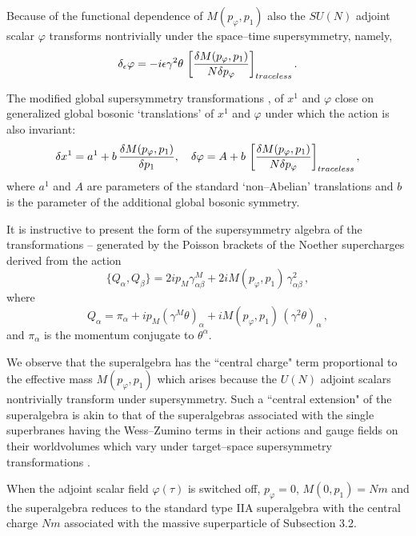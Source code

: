 \documentclass[a4paper,12pt]{article}
\begin{document}
Because of the functional dependence of $M(p_\varphi,p_1)$ also
the $SU(N)$ adjoint scalar $\varphi$ transforms nontrivially under
the space--time supersymmetry, namely,
\begin{equation}\label{varphi}
\delta_\epsilon\varphi=-i\epsilon\gamma^2\theta\,
\left[{{\delta M(p_\varphi,p_1)}\over{N\delta p_\varphi}}\right]_{traceless}.
\end{equation}

The modified global supersymmetry transformations ,
 of $x^1$ and $\varphi$ close on generalized global bosonic
`translations' of $x^1$ and $\varphi$ under which the action
 is also invariant:
\begin{equation}\label{b}
\delta x^1=a^1+b\,{{\delta
M(p_\varphi,p_1)}\over{\delta p_1}}, \quad
\delta\varphi=A+b\,\left[{{\delta M(p_\varphi,p_1)}
\over{N\delta p_\varphi}}\right]_{traceless},
\end{equation}
where $a^1$ and $A$ are parameters of the standard `non--Abelian'
translations and $b$ is the parameter of the additional global
bosonic symmetry.

It is instructive to present the form of the supersymmetry algebra
of the transformations -- generated by the  Poisson
brackets of the Noether supercharges derived from the action
\begin{equation}\label{susya}
\{Q_\alpha,Q_\beta\}=2ip_M\gamma^M_{\alpha\beta}
+2iM(p_\varphi,p_1)\,\gamma^2_{\alpha\beta}\,,
\end{equation}
where
\begin{equation}\label{Q}
Q_\alpha=\pi_\alpha+ip_M(\gamma^M\theta)_\alpha +
iM(p_\varphi,p_1)\,(\gamma^2\theta)_\alpha\,,
\end{equation}
and $\pi_\alpha$ is the momentum conjugate to $\theta^\alpha$.

We observe that the superalgebra  has the ``central
charge" term proportional to the effective mass
$M(p_\varphi,p_1)$ which arises because the $U(N)$ adjoint
scalars nontrivially transform
under supersymmetry. Such a ``central extension" of the
superalgebra is akin to that of the superalgebras associated with
the single superbranes having the Wess--Zumino terms in their
actions \cite{central} and gauge fields on their worldvolumes
which vary under target--space supersymmetry transformations
\cite{Sorokin:1997ps}.

When the adjoint scalar field
$\varphi(\tau)$ is switched off,
$p_\varphi=0$, $M(0,p_1)=Nm$ and the superalgebra
 reduces to the standard type IIA superalgebra with the
central charge $Nm$ associated with the massive superparticle of
Subsection 3.2.
\end{document}
